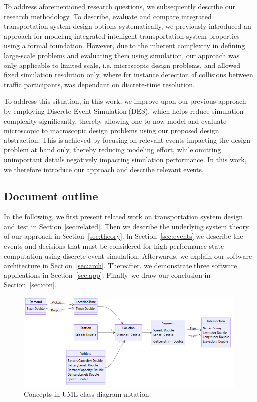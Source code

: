 \documentclass[graybox]{svmult}
\begin{document}
To address aforementioned research questions, we subsequently describe our research methodology. To describe, evaluate and compare integrated transportation system design options systematically, we previously introduced an approach for modeling integrated intelligent transportation system properties using a formal foundation. However, due to the inherent complexity in defining large-scale problems and evaluating them using simulation, our approach was only applicable to limited scale, i.e. microscopic design problems, and allowed fixed simulation resolution only, where for instance detection of collisions between traffic participants, was dependant on discrete-time resolution.  

To address this situation, in this work, we improve upon our previous approach by employing Discrete Event Simulation (DES), which helps reduce simulation complexity significantly, thereby allowing one to now model and evaluate microscopic to macroscopic design problems using our proposed design abstraction. This is achieved by focusing on relevant events impacting the design problem at hand only, thereby reducing modeling effort, while omitting unimportant details negatively impacting simulation performance. In this work, we therefore introduce our approach and describe relevant events. 


\subsection{Document outline}
In the following, we first present related work on transportation system design and test in Section~\ref{sec:related}.
Then we describe the underlying system theory of our approach in Section~\ref{sec:theory}.
In Section~\ref{sec:events} we describe the events and decisions that must be considered for high-performance state computation using discrete event simulation.
Afterwards, we explain our software architecture in Section~\ref{sec:arch}.
Thereafter, we demonstrate three software applications in Section~\ref{sec:app}.
Finally, we draw our conclusion in Section~\ref{sec:con}.


\begin{figure}[t]
	\centering
	\includegraphics[scale=0.4]{../../diagrams/model/classes-v0.png}
	\caption{Concepts in UML class diagram notation}
	\label{fig:concepts}
\end{figure}
\end{document}
